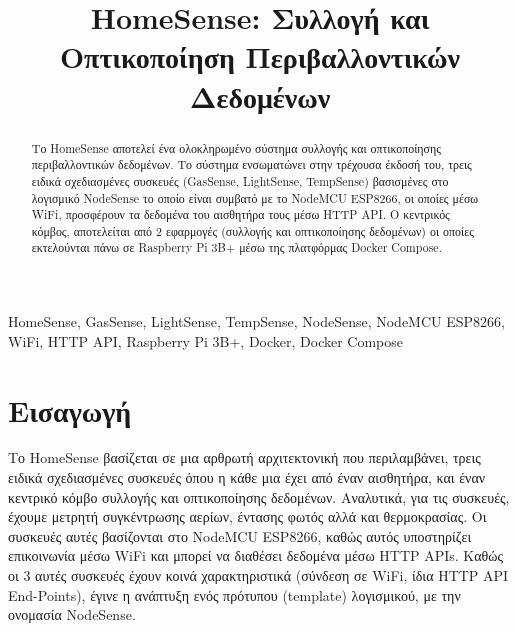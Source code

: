 \documentclass[conference]{IEEEtran}
\begin{document}
\title{HomeSense: Συλλογή και Οπτικοποίηση Περιβαλλοντικών Δεδομένων}

\author{
}

\maketitle

\begin{abstract}
	Το HomeSense αποτελεί ένα ολοκληρωμένο σύστημα συλλογής και οπτικοποίησης περιβαλλοντικών δεδομένων. Το σύστημα ενσωματώνει στην τρέχουσα έκδοσή του, τρεις ειδικά σχεδιασμένες συσκευές (GasSense, LightSense, TempSense) βασισμένες στο λογισμικό NodeSense το οποίο είναι συμβατό με το NodeMCU ESP8266, οι οποίες μέσω WiFi, προσφέρουν τα δεδομένα του αισθητήρα τους μέσω HTTP API. Ο κεντρικός κόμβος, αποτελείται από 2 εφαρμογές (συλλογής και οπτικοποίησης δεδομένων) οι οποίες εκτελούνται πάνω σε Raspberry Pi 3B+ μέσω της πλατφόρμας Docker Compose.\\
\end{abstract}

\begin{IEEEkeywords}
	HomeSense, GasSense, LightSense, TempSense, NodeSense, NodeMCU ESP8266, WiFi, HTTP API, Raspberry Pi 3B+, Docker, Docker Compose
\end{IEEEkeywords}

\section{Εισαγωγή}
Το HomeSense βασίζεται σε μια αρθρωτή αρχιτεκτονική που περιλαμβάνει, τρεις ειδικά σχεδιασμένες συσκευές όπου η κάθε μια έχει από έναν αισθητήρα, και έναν κεντρικό κόμβο συλλογής και οπτικοποίησης δεδομένων. Αναλυτικά, για τις συσκευές, έχουμε μετρητή συγκέντρωσης αερίων, έντασης φωτός αλλά και θερμοκρασίας. Οι συσκευές αυτές βασίζονται στο NodeMCU ESP8266, καθώς αυτός υποστηρίζει επικοινωνία μέσω WiFi και μπορεί να διαθέσει δεδομένα μέσω HTTP APIs. Καθώς οι 3 αυτές συσκευές έχουν κοινά χαρακτηριστικά (σύνδεση σε WiFi, ίδια HTTP API End-Points), έγινε η ανάπτυξη ενός πρότυπου (template) λογισμικού, με την ονομασία NodeSense.
\end{document}
